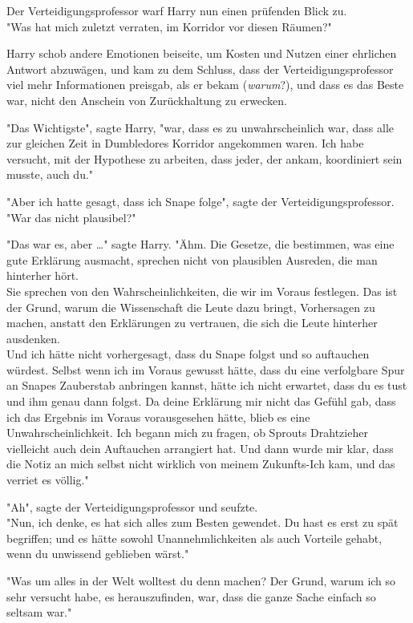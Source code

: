 {Der Verteidigungsprofessor warf Harry nun einen prüfenden Blick zu.\\ "Was hat mich zuletzt verraten, im Korridor vor diesen Räumen?"

Harry schob andere Emotionen beiseite, um Kosten und Nutzen einer ehrlichen Antwort abzuwägen, und kam zu dem Schluss, dass der Verteidigungsprofessor viel mehr Informationen preisgab, als er bekam (\emph{warum}?), und dass es das Beste war, nicht den Anschein von Zurückhaltung zu erwecken.

"Das Wichtigste", sagte Harry, "war, dass es zu unwahrscheinlich war, dass alle zur gleichen Zeit in Dumbledores Korridor angekommen waren. Ich habe versucht, mit der Hypothese zu arbeiten, dass jeder, der ankam, koordiniert sein musste, auch du."

"Aber ich hatte gesagt, dass ich Snape folge", sagte der Verteidigungsprofessor. "War das nicht plausibel?"

"Das war es, aber …" sagte Harry. "Ähm. Die Gesetze, die bestimmen, was eine gute Erklärung ausmacht, sprechen nicht von plausiblen Ausreden, die man hinterher hört.\\ Sie sprechen von den Wahrscheinlichkeiten, die wir im Voraus festlegen. Das ist der Grund, warum die Wissenschaft die Leute dazu bringt, Vorhersagen zu machen, anstatt den Erklärungen zu vertrauen, die sich die Leute hinterher ausdenken.\\ Und ich hätte nicht vorhergesagt, dass du Snape folgst und so auftauchen würdest. Selbst wenn ich im Voraus gewusst hätte, dass du eine verfolgbare Spur an Snapes Zauberstab anbringen kannst, hätte ich nicht erwartet, dass du es tust und ihm genau dann folgst. Da deine Erklärung mir nicht das Gefühl gab, dass ich das Ergebnis im Voraus vorausgesehen hätte, blieb es eine Unwahrscheinlichkeit. Ich begann mich zu fragen, ob Sprouts Drahtzieher vielleicht auch dein Auftauchen arrangiert hat. Und dann wurde mir klar, dass die Notiz an mich selbst nicht wirklich von meinem Zukunfts-Ich kam, und das verriet es völlig."

"Ah", sagte der Verteidigungsprofessor und seufzte.\\ "Nun, ich denke, es hat sich alles zum Besten gewendet. Du hast es erst zu spät begriffen; und es hätte sowohl Unannehmlichkeiten als auch Vorteile gehabt, wenn du unwissend geblieben wärst."

"Was um alles in der Welt wolltest du denn machen? Der Grund, warum ich so sehr versucht habe, es herauszufinden, war, dass die ganze Sache einfach so seltsam war."

}
